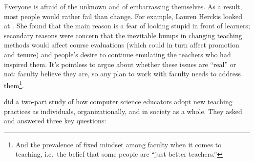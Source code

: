 Everyone is afraid of the unknown and of embarrassing themselves.
As a result,
most people would rather fail than change.
For example,
Lauren Herckis looked at
.
She found that the main reason is a fear of looking stupid in front of learners;
secondary reasons were
concern that the inevitable bumps in changing teaching methods would affect course evaluations
(which could in turn affect promotion and tenure)
and people's desire to continue emulating the teachers who had inspired them.
It's pointless to argue about whether these issues are ``real'' or not:
faculty believe they are,
so any plan to work with faculty needs to address them\footnote{
  And the prevalence of fixed mindset among faculty when it comes to teaching,
  i.e.\ the belief that some people are ``just better teachers.''
}.

\cite{Bark2015} did a two-part study of how computer science educators adopt new teaching practices
as individuals, organizationally, and in society as a whole.
They asked and answered three key questions:

